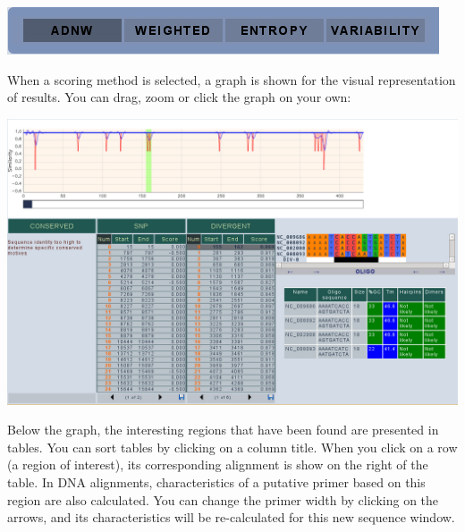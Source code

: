 \documentclass[12pt,oneside,a4paper,english]{article}  %
\begin{document}
\begin{center}
		\includegraphics[width=.8\linewidth]{pics/methods.jpg}
\end{center}
		
When a scoring method is selected, a graph is shown for the visual representation of results. You can drag, zoom or click the graph on your own:

\begin{center}
		\includegraphics[width=\linewidth]{pics/graph.jpg}
\end{center}

Below the graph, the interesting regions that have been found are presented in tables. You can sort tables by clicking on a column title. When you click on a row (a region of interest), its corresponding alignment is show on the right of the table. In DNA alignments, characteristics of a putative primer based on this region are also calculated. You can change the primer width by clicking on the arrows, and its characteristics will be re-calculated for this new sequence window.




%
\end{document}
